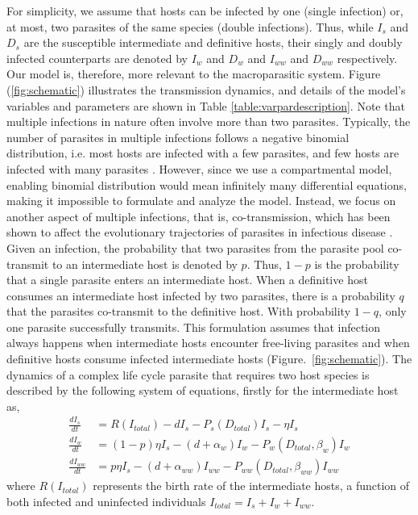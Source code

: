 \documentclass[a4paper]{scrartcl}
\begin{document}
For simplicity, we assume that hosts can be infected by one (single infection) or, at most, two parasites of the same species (double infections).
Thus, while $I_s$ and $D_s$ are the susceptible intermediate and definitive hosts, their singly and doubly infected counterparts are denoted by $I_w$ and $D_w$ and $I_{ww}$ and $D_{ww}$ respectively.
Our model is, therefore, more relevant to the macroparasitic system.
Figure (\ref{fig:schematic}) illustrates the transmission dynamics, and details of the model's variables and parameters are shown in Table \ref{table:varpardescription}.
Note that multiple infections in nature often involve more than two parasites.
Typically, the number of parasites in multiple infections follows a negative binomial distribution, i.e. most hosts are infected with a few parasites, and few hosts are infected with many parasites \citep{wilson:FE:1996}.
However, since we use a compartmental model, enabling binomial distribution would mean infinitely many differential equations, making it impossible to formulate and analyze the model.
Instead, we focus on another aspect of multiple infections, that is, co-transmission, which has been shown to affect the evolutionary trajectories of parasites in infectious disease \citep{Alizon2012}.
Given an infection, the probability that two parasites from the parasite pool co-transmit to an intermediate host is denoted by $p$. 
Thus, $1-p$ is the probability that a single parasite enters an intermediate host. 
When a definitive host consumes an intermediate host infected by two parasites, there is a probability $q$ that the parasites co-transmit to the definitive host.
With probability $1-q$, only one parasite successfully transmits. 
This formulation assumes that infection always happens when intermediate hosts encounter free-living parasites and when definitive hosts consume infected intermediate hosts (Figure.~\ref{fig:schematic}).
The dynamics of a complex life cycle parasite that requires two host species is described by the following system of equations, firstly for the intermediate host as,
%
\begin{align}
\frac{dI_s}{dt} &= R(I_{total}) - d I_s - P_s(D_{total}) I_s  - \eta  I_s \nonumber \\ 
\frac{dI_w}{dt} &=  (1 - p) \eta I_s  - (d + \alpha_w) I_w - P_w(D_{total}, \beta_w) I_w \label{odes:ihosts} \\
\frac{dI_{ww}}{dt} &= p \eta I_s  - (d + \alpha_{ww}) I_{ww} - P_{ww}(D_{total}, \beta_{ww}) I_{ww} \nonumber
\end{align}
%
where $R(I_{total})$ represents the birth rate of the intermediate hosts, a function of both infected and uninfected individuals $I_{total} = I_s + I_w + I_{ww}$.
\end{document}
